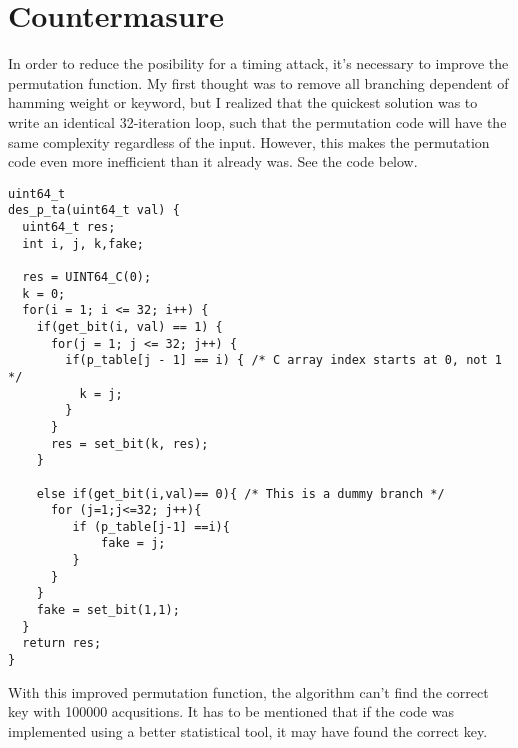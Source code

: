 \documentclass{article}
\begin{document}
\section{Countermasure}
In order to reduce the posibility for a timing attack, it's necessary to improve the permutation function. My first thought was to remove all branching dependent of hamming weight or keyword, but I realized that the quickest solution was to write an identical 32-iteration loop, such that the permutation code will have the same complexity regardless of the input. However, this makes the permutation code even more inefficient than it already was. See the code below.
 

 
\begin{lstlisting}
uint64_t
des_p_ta(uint64_t val) {
  uint64_t res;
  int i, j, k,fake;

  res = UINT64_C(0);
  k = 0;
  for(i = 1; i <= 32; i++) {
    if(get_bit(i, val) == 1) {
      for(j = 1; j <= 32; j++) {
        if(p_table[j - 1] == i) { /* C array index starts at 0, not 1 */
          k = j;
        }
      }
      res = set_bit(k, res);
    }

    else if(get_bit(i,val)== 0){ /* This is a dummy branch */
      for (j=1;j<=32; j++){
         if (p_table[j-1] ==i){
             fake = j;
         }
      }
    }
    fake = set_bit(1,1);
  }
  return res;
}
\end{lstlisting}

With this improved permutation function, the algorithm can't find the correct key with 100000 acqusitions. It has to be mentioned that if the code was implemented using a better statistical tool, it may have found the correct key. 
\end{document}
